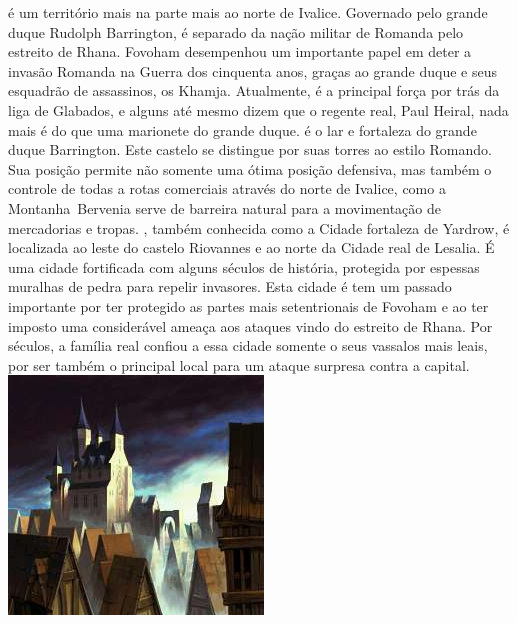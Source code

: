 %
\vspace*{\fill}
%
 é um território mais na parte mais ao norte de Ivalice. Governado pelo grande duque Rudolph Barrington, é separado da nação militar de Romanda pelo estreito de Rhana.
Fovoham desempenhou um importante papel em deter a invasão Romanda na Guerra dos cinquenta anos, graças ao grande duque e seus esquadrão de assassinos, os Khamja. Atualmente, é a principal força por trás da liga de Glabados, e alguns até mesmo dizem que o regente real, Paul Heiral, nada mais é do que uma marionete do grande duque. 
 é o lar e fortaleza do grande duque Barrington. 
Este castelo se distingue por suas torres ao estilo Romando.
Sua posição permite não somente uma ótima posição defensiva, mas também o controle de todas a rotas comerciais através do norte de Ivalice, como a Montanha~Bervenia serve de barreira natural para a movimentação de mercadorias e tropas.
, também conhecida como a Cidade fortaleza de Yardrow, é localizada ao leste do castelo Riovannes e ao norte da Cidade real de Lesalia. É uma cidade fortificada com alguns séculos de história, protegida por espessas muralhas de pedra para repelir invasores.
Esta cidade é tem um passado importante por ter protegido as partes mais setentrionais de Fovoham e ao ter imposto uma considerável ameaça aos ataques vindo do estreito de Rhana.
Por séculos, a família real confiou a essa cidade somente o seus vassalos mais leais, por ser também o principal local para um ataque surpresa contra a capital.
%
\newpage
%
\vspace*{\fill}
\includegraphics[width=\columnwidth]{./art/worldbook/riovanes.jpg}
